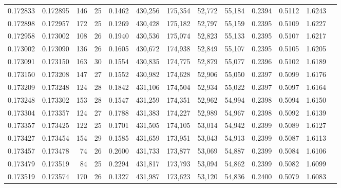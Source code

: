 \begin{tabular}{rrrrrrrrrrrrr}
0.172833 & 0.172895 & 146 &  25 &                                     0.1462 & 430,256 & 175,354 &  52,772 &  55,184 & 0.2394 & 0.5112 & 1.6243 \\
0.172898 & 0.172957 & 172 &  25 &                                     0.1269 & 430,428 & 175,182 &  52,797 &  55,159 & 0.2395 & 0.5109 & 1.6227 \\
0.172958 & 0.173002 & 108 &  26 &                                     0.1940 & 430,536 & 175,074 &  52,823 &  55,133 & 0.2395 & 0.5107 & 1.6217 \\
0.173002 & 0.173090 & 136 &  26 &                                     0.1605 & 430,672 & 174,938 &  52,849 &  55,107 & 0.2395 & 0.5105 & 1.6205 \\
0.173091 & 0.173150 & 163 &  30 &                                     0.1554 & 430,835 & 174,775 &  52,879 &  55,077 & 0.2396 & 0.5102 & 1.6189 \\
0.173150 & 0.173208 & 147 &  27 &                                     0.1552 & 430,982 & 174,628 &  52,906 &  55,050 & 0.2397 & 0.5099 & 1.6176 \\
0.173209 & 0.173248 & 124 &  28 &                                     0.1842 & 431,106 & 174,504 &  52,934 &  55,022 & 0.2397 & 0.5097 & 1.6164 \\
0.173248 & 0.173302 & 153 &  28 &                                     0.1547 & 431,259 & 174,351 &  52,962 &  54,994 & 0.2398 & 0.5094 & 1.6150 \\
0.173304 & 0.173357 & 124 &  27 &                                     0.1788 & 431,383 & 174,227 &  52,989 &  54,967 & 0.2398 & 0.5092 & 1.6139 \\
0.173357 & 0.173425 & 122 &  25 &                                     0.1701 & 431,505 & 174,105 &  53,014 &  54,942 & 0.2399 & 0.5089 & 1.6127 \\
0.173427 & 0.173454 & 154 &  29 &                                     0.1585 & 431,659 & 173,951 &  53,043 &  54,913 & 0.2399 & 0.5087 & 1.6113 \\
0.173457 & 0.173478 &  74 &  26 &                                     0.2600 & 431,733 & 173,877 &  53,069 &  54,887 & 0.2399 & 0.5084 & 1.6106 \\
0.173479 & 0.173519 &  84 &  25 &                                     0.2294 & 431,817 & 173,793 &  53,094 &  54,862 & 0.2399 & 0.5082 & 1.6099 \\
0.173519 & 0.173574 & 170 &  26 &                                     0.1327 & 431,987 & 173,623 &  53,120 &  54,836 & 0.2400 & 0.5079 & 1.6083 \\

\end{tabular}
